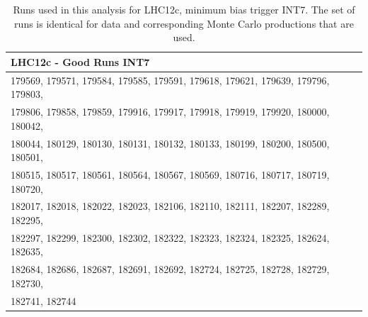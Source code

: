 \documentclass[ALICE]{ALICE_analysis_notes}
\begin{document}
\begin{appendix}
\begin{table}[h!]
	\hspace*{-0.2cm}
	\small
	\centering
	\begin{tabular}{ll}  
	    \toprule
	    \textbf{LHC12c - Good Runs INT7} \\ \midrule
		179569, 179571, 179584, 179585, 179591, 179618, 179621, 179639, 179796, 179803,  \\ \midrule
		179806, 179858, 179859, 179916, 179917, 179918, 179919, 179920, 180000, 180042,  \\ \midrule
		180044, 180129, 180130, 180131, 180132, 180133, 180199, 180200, 180500, 180501,  \\ \midrule 
		180515, 180517, 180561, 180564, 180567, 180569, 180716, 180717, 180719, 180720,  \\ \midrule 
		182017, 182018, 182022, 182023, 182106, 182110, 182111, 182207, 182289, 182295,  \\ \midrule 
		182297, 182299, 182300, 182302, 182322, 182323, 182324, 182325, 182624, 182635,  \\ \midrule 
		182684, 182686, 182687, 182691, 182692, 182724, 182725, 182728, 182729, 182730,  \\ \midrule 
		182741, 182744 \\
		\bottomrule
	\end{tabular}
	\caption{Runs used in this analysis for LHC12c, minimum bias trigger INT7. The set of runs is identical for data and corresponding Monte Carlo productions that are used.}
	\label{tab:runs12c}
\end{table}


\end{appendix}
\end{document}
